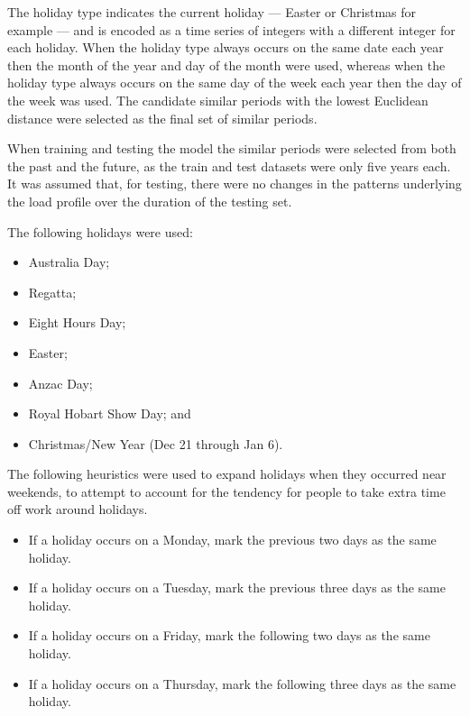 The holiday type indicates the current holiday --- Easter or Christmas for example --- and is encoded as a time series of integers with a different integer for each holiday.
When the holiday type always occurs on the same date each year then the month of the year and day of the month were used, whereas when the holiday type always occurs on the same day of the week each year then the day of the week was used.
The candidate similar periods with the lowest Euclidean distance were selected as the final set of similar periods.

When training and testing the model the similar periods were selected from both the past and the future, as the train and test datasets were only five years each.
It was assumed that, for testing, there were no changes in the patterns underlying the load profile over the duration of the testing set.

The following holidays were used:
 \begin{itemize}
 	\item Australia Day;
 	\item Regatta;
 	\item Eight Hours Day;
 	\item Easter;
 	\item Anzac Day;
 	\item Royal Hobart Show Day; and
 	\item Christmas/New Year (Dec 21 through Jan 6).
 \end{itemize}
The following heuristics were used to expand holidays when they occurred near weekends, to attempt to account for the tendency for people to take extra time off work around holidays.
\begin{itemize}
	\item If a holiday occurs on a Monday, mark the previous two days as the same holiday.
	\item If a holiday occurs on a Tuesday, mark the previous three days as the same holiday.
	\item If a holiday occurs on a Friday, mark the following two days as the same holiday.
	\item If a holiday occurs on a Thursday, mark the following three days as the same holiday.
\end{itemize}